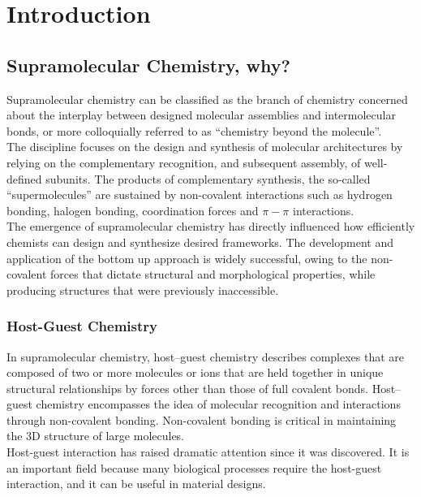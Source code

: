 \documentclass[../Master.tex]{subfiles}
\begin{document}
\chapter{Introduction}
\section{Supramolecular Chemistry, why?}\label{sec:supramolecular-chemistry}
Supramolecular chemistry can be classified as the branch of chemistry concerned about the interplay between designed molecular assemblies and intermolecular bonds, or more colloquially referred to as ``chemistry beyond the molecule''\cite{desiraju_chemistry_2001}. \\
The discipline focuses on the design and synthesis of molecular architectures by relying on the complementary recognition, and subsequent assembly, of well-defined subunits. The products of complementary synthesis, the so-called ``supermolecules'' are sustained by non-covalent interactions such as hydrogen bonding, halogen bonding, coordination forces and \(\pi-\pi\) interactions. \\
The emergence of supramolecular chemistry has directly influenced how efficiently chemists can design and synthesize desired frameworks. The development and application of the bottom up approach is widely successful, owing to the non-covalent forces that dictate structural and morphological properties, while producing structures that were previously inaccessible.

\subsection{Host-Guest Chemistry}\label{subsec:host-guest-chemistry}
In supramolecular chemistry, host–guest chemistry describes complexes that are composed of two or more molecules or ions that are held together in unique structural relationships by forces other than those of full covalent bonds. Host–guest chemistry encompasses the idea of molecular recognition and interactions through non-covalent bonding. Non-covalent bonding is critical in maintaining the 3D structure of large molecules.\\
Host-guest interaction has raised dramatic attention since it was discovered. It is an important field because many biological processes require the host-guest interaction, and it can be useful in material designs.
\end{document}
